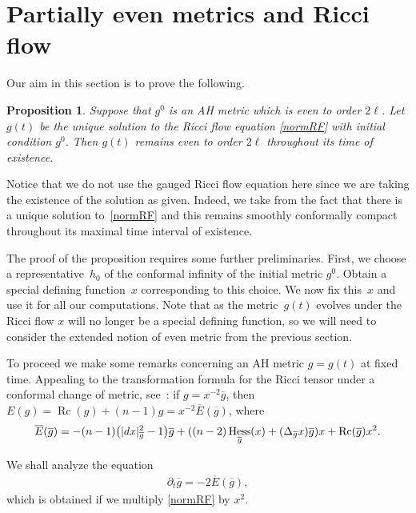 \documentclass[11pt]{article}
\numberwithin{equation}{section}
\newtheorem{Proposition}[Theorem]{Proposition}
 { \theoremstyle{definition}
\newtheorem{Definition}[Theorem]{Definition}
\newtheorem{Example}[Theorem]{Example}
\newtheorem{Remark}[Theorem]{Remark} }
\newcommand{\del}{\partial}
\newcommand{\olg}{\overline{g}}
\newcommand{\olE}{\overline{E}}
\newcommand{\gin}{{g^0}}
\newcommand{\gbar}{\overline{g}}
\DeclareMathOperator{\Rc}{Rc}
\DeclareMathOperator{\hess}{Hess}
\begin{document}
\section{Partially even metrics and Ricci flow} \label{PEandRF}

Our aim in this section is to prove the following.

\begin{Proposition} \label{prop:even-expansions-preserved}	Suppose that $\gin$ is an AH metric which is even to order $2\ell$. Let $g(t)$ be the unique solution to the Ricci flow	equation \eqref{normRF} with initial condition $\gin$. Then $g(t)$ remains even to order $2\ell$ throughout its time of existence.
\end{Proposition}

Notice that we do not use the gauged Ricci flow equation here since we are taking the existence of the solution as given. Indeed, we take from \cite{Bahuaud} the fact that there is a unique solution to~\eqref{normRF} and this remains smoothly conformally compact throughout its maximal time interval of existence.

The proof of the proposition requires some further preliminaries. First, we choose a representative~$h_0$ of the conformal infinity of the initial metric $\gin$. Obtain a special defining function~$x$ corresponding to this choice. We now fix this~$x$ and use it for all our computations. Note that as the metric~$g(t)$ evolves under the Ricci flow $x$ will no longer be a special defining function, so we will need to consider the extended notion of even metric from the previous section.

To proceed we make some remarks concerning an AH metric $g = g(t)$ at fixed time. Appealing to the transformation formula for the Ricci tensor under a conformal change of metric, see~\cite{Besse}:
if $g = x^{-2} \olg$, then $E(g) = \Rc(g) + (n-1)g = x^{-2} \olE(\olg)$, where
\begin{gather}\label{eq2.1}
\olE(\olg) = - (n-1) \big(|{\rm d}x|^2_{\gbar} -1\big) \olg + ( (n-2) \hess_{\olg} (x) + (\Delta_{\olg} x) \olg ) x + \Rc(\gbar) x^2 .
\end{gather}

We shall analyze the equation
\begin{gather}
\del_t \olg = -2 \olE( \olg),\label{rf1}
\end{gather}
which is obtained if we multiply \eqref{normRF} by $x^2$.
\end{document}
